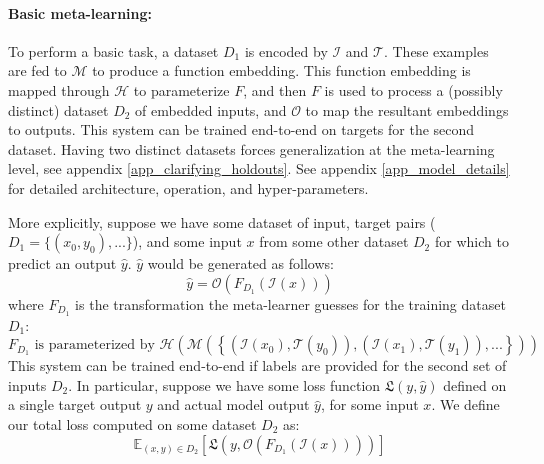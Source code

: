 \documentclass{article}
\begin{document}
\paragraph{Basic meta-learning:} To perform a basic task, a dataset $D_1$ is encoded by $\mathcal{I}$ and $\mathcal{T}$. These examples are fed to $\mathcal{M}$ to produce a function embedding. This function embedding is mapped through $\mathcal{H}$ to parameterize $F$, and then $F$ is used to process a (possibly distinct) dataset $D_2$ of embedded inputs, and $\mathcal{O}$ to map the resultant embeddings to outputs. This system can be trained end-to-end on targets for the second dataset. Having two distinct datasets forces generalization at the meta-learning level, see appendix \ref{app_clarifying_holdouts}. See appendix \ref{app_model_details} for detailed architecture, operation, and hyper-parameters. \par 
More explicitly, suppose we have some dataset of input, target pairs ($D_1 = \{(x_0, y_0), ...\}$), and some input $x$ from some other dataset $D_2$ for which to predict an output $\hat{y}$. $\hat{y}$ would be generated as follows: 
\[\hat{y} = \mathcal{O}\left(F_{D_1}\left(\mathcal{I} \left(x\right)\right) \right)\]
where $F_{D_1}$ is the transformation the meta-learner guesses for the training dataset $D_1$:
\[F_{D_1} \text{ is parameterized by } \mathcal{H}\left(\mathcal{M}\left( \left\{\left(\mathcal{I}\left(x_0\right), \mathcal{T}\left(y_0\right) \right), \left(\mathcal{I}\left(x_1\right), \mathcal{T}\left(y_1\right) \right), ... \right\}\right)\right)\]
This system can be trained end-to-end if labels are provided for the second set of inputs $D_2$. In particular, suppose we have some loss function $\mathfrak{L}(y, \hat{y})$ defined on a single target output $y$ and actual model output $\hat{y}$, for some input $x$. We define our total loss computed on some dataset $D_2$ as:
\[\mathbb{E}_{(x, y)\in {D}_2} \left[ \mathfrak{L}\left(y, \mathcal{O}\left(F_{D_1}\left(\mathcal{I} \left(x\right)\right) \right)\right)\right]\]
\end{document}
